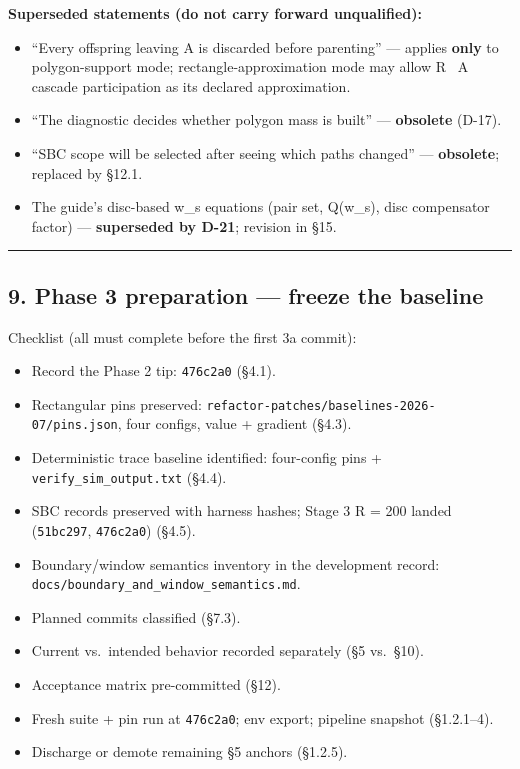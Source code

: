 \documentclass[
  10pt,
]{article}
\providecommand{\tightlist}{%
  \setlength{\itemsep}{0pt}\setlength{\parskip}{0pt}}
\begin{document}
\textbf{Superseded statements (do not carry forward unqualified):}

\begin{itemize}
\tightlist
\item
  ``Every offspring leaving A is discarded before parenting'' --- applies \textbf{only} to polygon-support mode; rectangle-approximation mode may allow R ~A cascade participation as its declared approximation.
\item
  ``The diagnostic decides whether polygon mass is built'' --- \textbf{obsolete} (D-17).
\item
  ``SBC scope will be selected after seeing which paths changed'' --- \textbf{obsolete}; replaced by §12.1.
\item
  The guide's disc-based w\_s equations (pair set, Q(w\_s), disc compensator factor) --- \textbf{superseded by D-21}; revision in §15.
\end{itemize}

\begin{center}\rule{0.5\linewidth}{0.5pt}\end{center}

\hypertarget{phase-3-preparation-freeze-the-baseline}{%
\subsection{9. Phase 3 preparation --- freeze the baseline}\label{phase-3-preparation-freeze-the-baseline}}

Checklist (all must complete before the first 3a commit):

\begin{itemize}
\tightlist
\item[$\boxtimes$]
  Record the Phase 2 tip: \texttt{476c2a0} (§4.1).
\item[$\boxtimes$]
  Rectangular pins preserved: \texttt{refactor-patches/\allowbreak{}baselines-2026-07/\allowbreak{}pins.json}, four configs, value + gradient (§4.3).
\item[$\boxtimes$]
  Deterministic trace baseline identified: four-config pins + \texttt{verify\_sim\_output.txt} (§4.4).
\item[$\boxtimes$]
  SBC records preserved with harness hashes; Stage 3 R = 200 landed (\texttt{51bc297}, \texttt{476c2a0}) (§4.5).
\item[$\boxtimes$]
  Boundary/window semantics inventory in the development record: \texttt{docs/\allowbreak{}boundary\_\allowbreak{}and\_\allowbreak{}window\_\allowbreak{}semantics.md}.
\item[$\boxtimes$]
  Planned commits classified (§7.3).
\item[$\boxtimes$]
  Current vs.~intended behavior recorded separately (§5 vs.~§10).
\item[$\boxtimes$]
  Acceptance matrix pre-committed (§12).
\item[$\boxtimes$]
  Fresh suite + pin run at \texttt{476c2a0}; env export; pipeline snapshot (§1.2.1--4).
\item[$\boxtimes$]
  Discharge or demote remaining §5 anchors (§1.2.5).
\end{itemize}
\end{document}
